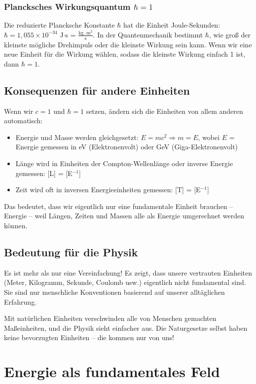 \documentclass[12pt,a4paper]{article}
\begin{document}
	\subsubsection{Plancksches Wirkungsquantum $\hbar = 1$}
	Die reduzierte Plancksche Konstante $\hbar$ hat die Einheit Joule-Sekunden: $\hbar = 1,055 \times 10^{-34}$ J$\cdot$s = $\frac{\text{kg} \cdot \text{m}^2}{\text{s}}$. In der Quantenmechanik bestimmt $\hbar$, wie groß der kleinste mögliche Drehimpuls oder die kleinste Wirkung sein kann. Wenn wir eine neue Einheit für die Wirkung wählen, sodass die kleinste Wirkung einfach 1 ist, dann $\hbar = 1$.
	
	\subsection{Konsequenzen für andere Einheiten}
	Wenn wir $c = 1$ und $\hbar = 1$ setzen, ändern sich die Einheiten von allem anderen automatisch:
	
	\begin{itemize}
		\item Energie und Masse werden gleichgesetzt: $E = mc^2 \Rightarrow m = E$, wobei $E$ = Energie gemessen in eV (Elektronenvolt) oder GeV (Giga-Elektronenvolt)
		\item Länge wird in Einheiten der Compton-Wellenlänge oder inverse Energie gemessen: [L] = [E$^{-1}$]
		\item Zeit wird oft in inversen Energieeinheiten gemessen: [T] = [E$^{-1}$]
	\end{itemize}
	
	Das bedeutet, dass wir eigentlich nur eine fundamentale Einheit brauchen – Energie – weil Längen, Zeiten und Massen alle als Energie umgerechnet werden können.
	
	\subsection{Bedeutung für die Physik}
	Es ist mehr als nur eine Vereinfachung! Es zeigt, dass unsere vertrauten Einheiten (Meter, Kilogramm, Sekunde, Coulomb usw.) eigentlich nicht fundamental sind. Sie sind nur menschliche Konventionen basierend auf unserer alltäglichen Erfahrung.
	
	Mit natürlichen Einheiten verschwinden alle von Menschen gemachten Maßeinheiten, und die Physik sieht einfacher aus. Die Naturgesetze selbst haben keine bevorzugten Einheiten – die kommen nur von uns!
	
	\section{Energie als fundamentales Feld}
	
\end{document}
